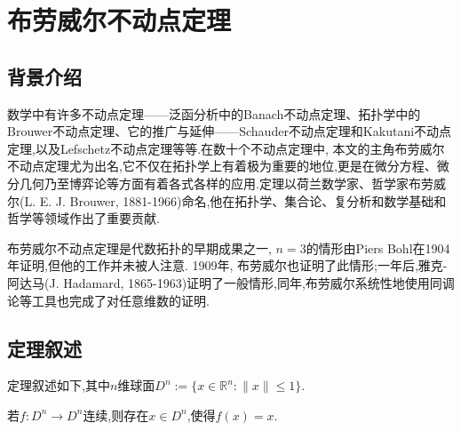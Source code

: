 \documentclass[main]{subfiles}
\newcommand{\mr}{\mathbb{R}}
\renewcommand{\leq}{\leqslant}
\begin{document}
\renewcommand{\filename}{14. Brouwer不动点定理}%
\section*{布劳威尔不动点定理}
\subsection*{背景介绍}
数学中有许多不动点定理——泛函分析中的Banach不动点定理、拓扑学中的Brouwer不动点定理、它的推广与延伸——Schauder不动点定理和Kakutani不动点定理,以及Lefschetz不动点定理等等.在数十个不动点定理中, 本文的主角布劳威尔不动点定理尤为出名,它不仅在拓扑学上有着极为重要的地位,更是在微分方程、微分几何乃至博弈论等方面有着各式各样的应用.定理以荷兰数学家、哲学家布劳威尔(L. E. J. Brouwer, 1881-1966)命名,他在拓扑学、集合论、复分析和数学基础和哲学等领域作出了重要贡献.

布劳威尔不动点定理是代数拓扑的早期成果之一, $n=3$的情形由Piers Bohl在1904年证明,但他的工作并未被人注意. 1909年, 布劳威尔也证明了此情形;一年后,雅克-阿达马(J. Hadamard, 1865-1963)证明了一般情形,同年,布劳威尔系统性地使用同调论等工具也完成了对任意维数的证明.
\subsection*{定理叙述}
定理叙述如下,其中$n$维球面$D^n:=\{x\in\mr^n:\|x\|\leq1\}$.
\begin{theorem}\label{thm:1}
若$f:D^n\to D^n$连续,则存在$x\in D^n$,使得$f(x)=x$.
\end{theorem}
\end{document}

